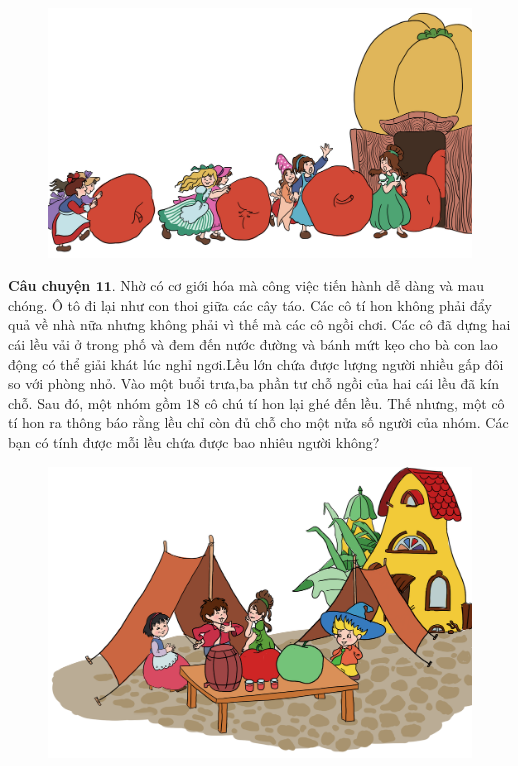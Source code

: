 	\begin{figure}[H]
		\centering
		\vspace*{-5pt}
		\captionsetup{labelformat= empty, justification=centering}
		\includegraphics[width=0.6\linewidth]{Hinh12_ChuyenTao}
		\vspace*{-10pt}
	\end{figure}
	\textbf{\color{toancuabi}Câu chuyện $\pmb{11.}$} Nhờ có cơ giới hóa mà công việc tiến hành dễ dàng và mau chóng. Ô tô đi lại như con thoi giữa các cây táo. Các cô tí hon không phải đẩy quả về nhà nữa nhưng không phải vì thế mà các cô ngồi chơi. Các cô đã dựng hai cái lều vải ở trong phố và đem đến nước đường và bánh mứt kẹo cho bà con lao động có thể giải khát lúc nghỉ ngơi.Lều lớn chứa được lượng người nhiều gấp đôi so với phòng nhỏ. Vào một buổi trưa,ba phần tư chỗ ngồi của hai cái lều đã kín chỗ. Sau đó, một nhóm gồm $18$ cô chú tí hon lại ghé đến lều. Thế nhưng, một cô tí hon ra thông báo rằng lều chỉ còn đủ chỗ cho một nửa số người của nhóm. Các bạn có tính được mỗi lều chứa được bao nhiêu người không?
		\begin{figure}[H]
		\centering
		\vspace*{-5pt}
		\captionsetup{labelformat= empty, justification=centering}
		\includegraphics[width=0.55\linewidth]{Hinh13_Leu}
		\vspace*{-10pt}
	\end{figure}
